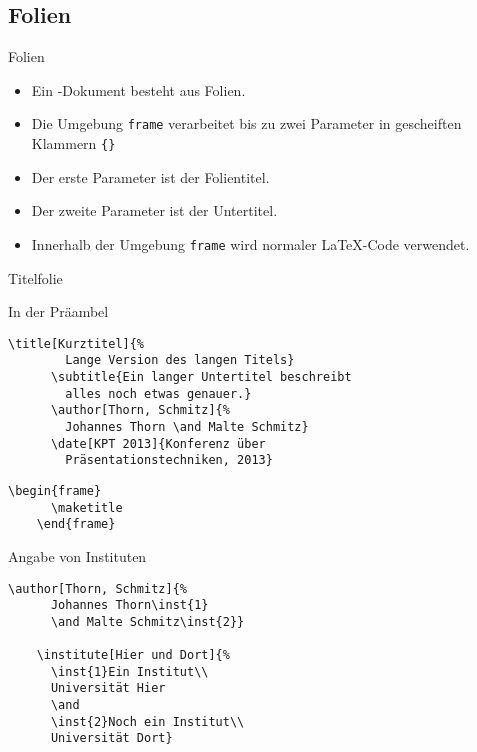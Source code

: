 \subsection{Folien}

\begin{Frame}[fragile]{Folien}
  \begin{itemize}
    \item Ein \beamer-Dokument besteht aus Folien.
    \item Die Umgebung \lstinline-frame- verarbeitet
      bis zu zwei Parameter in gescheiften Klammern \lstinline-{}-
    \item Der erste Parameter ist der Folientitel.
    \item Der zweite Parameter ist der Untertitel.
    \item Innerhalb der Umgebung \lstinline|frame| wird normaler \LaTeX-Code
      verwendet.
  \end{itemize}
\end{Frame}

\begin{Frame}[fragile]{Titelfolie}
  \begin{Block}{In der Präambel}
    \begin{lstlisting}[gobble=6,style=block]
      \title[Kurztitel]{%
        Lange Version des langen Titels}
      \subtitle{Ein langer Untertitel beschreibt
        alles noch etwas genauer.}
      \author[Thorn, Schmitz]{%
        Johannes Thorn \and Malte Schmitz}
      \date[KPT 2013]{Konferenz über
        Präsentationstechniken, 2013}
    \end{lstlisting}
  \end{Block}

  \begin{lstlisting}[gobble=4]
    \begin{frame}
      \maketitle
    \end{frame}
  \end{lstlisting}
\end{Frame}

\begin{Frame}[fragile]{Angabe von Instituten}
  \begin{lstlisting}[gobble=4]
    \author[Thorn, Schmitz]{%
      Johannes Thorn\inst{1}
      \and Malte Schmitz\inst{2}}

    \institute[Hier und Dort]{%
      \inst{1}Ein Institut\\
      Universität Hier
      \and
      \inst{2}Noch ein Institut\\
      Universität Dort}
  \end{lstlisting}
\end{Frame}

